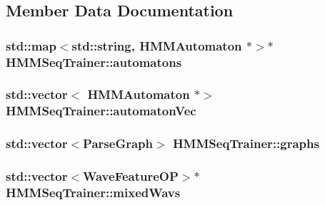 \subsection{Member Data Documentation}
\hypertarget{class_h_m_m_seq_trainer_a70439ad48e64f17d74cdc968effb467f}{
\subsubsection[{automatons}]{\setlength{\rightskip}{0pt plus 5cm}std\+::map$<$std\+::string, {\bf H\+M\+M\+Automaton} $\ast$$>$$\ast$ H\+M\+M\+Seq\+Trainer\+::automatons\hspace{0.3cm}{\ttfamily [protected]}}}\label{class_h_m_m_seq_trainer_a70439ad48e64f17d74cdc968effb467f}
\hypertarget{class_h_m_m_seq_trainer_adbd7d13034cdf37f36bc8918f2b2b966}{
\subsubsection[{automaton\+Vec}]{\setlength{\rightskip}{0pt plus 5cm}std\+::vector$<$ {\bf H\+M\+M\+Automaton} $\ast$$>$ H\+M\+M\+Seq\+Trainer\+::automaton\+Vec\hspace{0.3cm}{\ttfamily [protected]}}}\label{class_h_m_m_seq_trainer_adbd7d13034cdf37f36bc8918f2b2b966}
\hypertarget{class_h_m_m_seq_trainer_a26beb77bab1fd38efa19cd4122f07c01}{
\subsubsection[{graphs}]{\setlength{\rightskip}{0pt plus 5cm}std\+::vector$<${\bf Parse\+Graph}$>$ H\+M\+M\+Seq\+Trainer\+::graphs\hspace{0.3cm}{\ttfamily [protected]}}}\label{class_h_m_m_seq_trainer_a26beb77bab1fd38efa19cd4122f07c01}
\hypertarget{class_h_m_m_seq_trainer_a74e6e47e0a794b07e0971cc482ebb5b3}{
\subsubsection[{mixed\+Wavs}]{\setlength{\rightskip}{0pt plus 5cm}std\+::vector$<${\bf Wave\+Feature\+O\+P}$>$$\ast$ H\+M\+M\+Seq\+Trainer\+::mixed\+Wavs\hspace{0.3cm}{\ttfamily [protected]}}}\label{class_h_m_m_seq_trainer_a74e6e47e0a794b07e0971cc482ebb5b3}
